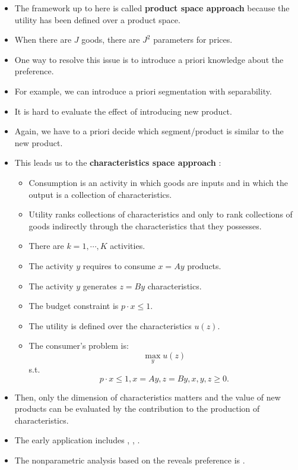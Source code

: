 \documentclass[]{book}
\providecommand{\tightlist}{%
  \setlength{\itemsep}{0pt}\setlength{\parskip}{0pt}}
\begin{document}
\begin{itemize}
\tightlist
\item
  The framework up to here is called \textbf{product space approach}
  because the utility has been defined over a product space.
\item
  When there are \(J\) goods, there are \(J^2\) parameters for prices.
\item
  One way to resolve this issue is to introduce a priori knowledge about
  the preference.
\item
  For example, we can introduce a priori segmentation with separability.
\item
  It is hard to evaluate the effect of introducing new product.
\item
  Again, we have to a priori decide which segment/product is similar to
  the new product.
\item
  This leads us to the \textbf{characteristics space approach}
  \citep{Lancaster1966, Muth1966}:

  \begin{itemize}
  \tightlist
  \item
    Consumption is an activity in which goods are inputs and in which
    the output is a collection of characteristics.
  \item
    Utility ranks collections of characteristics and only to rank
    collections of goods indirectly through the characteristics that
    they possesses.
  \item
    There are \(k = 1, \cdots, K\) activities.
  \item
    The activity \(y\) requires to consume \(x = A y\) products.
  \item
    The activity \(y\) generates \(z = B y\) characteristics.
  \item
    The budget constraint is \(p \cdot x \le 1\).
  \item
    The utility is defined over the characteristics \(u(z)\).
  \item
    The consumer's problem is: \[
    \max_y u(z)
    \] s.t. \[
    p \cdot x \le 1, x = Ay, z = By, x, y, z \ge 0.
    \]
  \end{itemize}
\item
  Then, only the dimension of characteristics matters and the value of
  new products can be evaluated by the contribution to the production of
  characteristics.
\item
  The early application includes \citet{Rosen1974},
  \citet{Muellbauer1974}, \citet{Gorman1980}.
\item
  The nonparametric analysis based on the reveals preference is
  \citet{Blow2008}.
\end{itemize}
\end{document}
